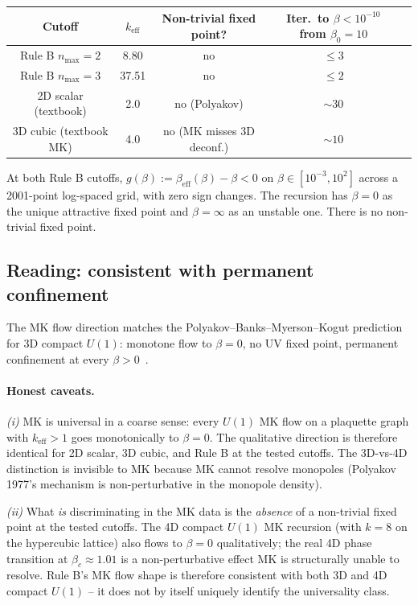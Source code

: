 \documentclass[11pt]{article}
\begin{document}
\begin{center}
\begin{tabular}{ccccc}
\toprule
Cutoff & $k_\text{eff}$ & Non-trivial fixed point? & Iter.\ to $\beta<10^{-10}$ from $\beta_0=10$ \\
\midrule
Rule B $n_\text{max}=2$ & 8.80  & no & $\le 3$ \\
Rule B $n_\text{max}=3$ & 37.51 & no & $\le 2$ \\
2D scalar (textbook)    & 2.0   & no (Polyakov) & $\sim 30$ \\
3D cubic (textbook MK)  & 4.0   & no (MK misses 3D deconf.) & $\sim 10$ \\
\bottomrule
\end{tabular}
\end{center}

At both Rule B cutoffs, $g(\beta):=\beta_\text{eff}(\beta)-\beta<0$ on
$\beta\in[10^{-3},10^2]$ across a 2001-point log-spaced grid, with zero sign
changes. The recursion has $\beta=0$ as the unique attractive fixed point and
$\beta=\infty$ as an unstable one. There is no non-trivial fixed point.

\subsection{Reading: consistent with permanent confinement}

The MK flow direction matches the Polyakov--Banks--Myerson--Kogut prediction
for 3D compact $U(1)$: monotone flow to $\beta=0$, no UV fixed point,
permanent confinement at every $\beta>0$~\cite{polyakov1977,banks_myerson_kogut1977,guth1980}.

\paragraph{Honest caveats.}

\emph{(i)} MK is universal in a coarse sense: every $U(1)$ MK flow on a
plaquette graph with $k_\text{eff}>1$ goes monotonically to $\beta=0$. The
qualitative direction is therefore identical for 2D scalar, 3D cubic, and
Rule B at the tested cutoffs. The 3D-vs-4D distinction is invisible to MK
because MK cannot resolve monopoles (Polyakov 1977's mechanism is non-perturbative
in the monopole density).

\emph{(ii)} What \emph{is} discriminating in the MK data is the
\emph{absence} of a non-trivial fixed point at the tested cutoffs. The 4D
compact $U(1)$ MK recursion (with $k=8$ on the hypercubic lattice) also flows
to $\beta=0$ qualitatively; the real 4D phase transition at $\beta_c\approx 1.01$
is a non-perturbative effect MK is structurally unable to resolve. Rule B's MK
flow shape is therefore consistent with both 3D and 4D compact $U(1)$ -- it
does not by itself uniquely identify the universality class.
\end{document}
